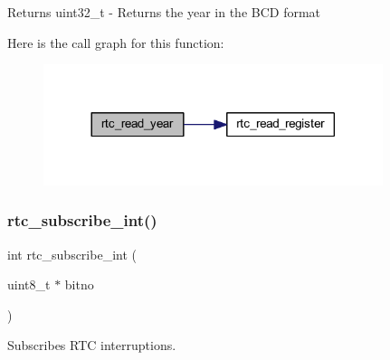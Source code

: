 \begin{DoxyReturn}{Returns}
uint32\+\_\+t -\/ Returns the year in the B\+CD format 
\end{DoxyReturn}
Here is the call graph for this function\+:
\nopagebreak
\begin{figure}[H]
\begin{center}
\leavevmode
\includegraphics[width=281pt]{group__rtc_ga4ddd82a19df760d95b2dd0c92ec6c63b_cgraph}
\end{center}
\end{figure}
\mbox{\label{group__rtc_ga7c28e3528db0f743706f9c01608331a7}} 
\subsubsection{\texorpdfstring{rtc\+\_\+subscribe\+\_\+int()}{rtc\_subscribe\_int()}}
{\footnotesize\ttfamily int rtc\+\_\+subscribe\+\_\+int (\begin{DoxyParamCaption}\item[{uint8\+\_\+t $\ast$}]{bitno }\end{DoxyParamCaption})}



Subscribes R\+TC interruptions. 


